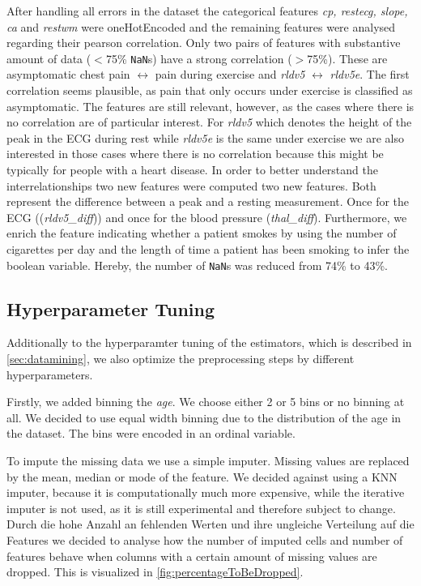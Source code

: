 After handling all errors in the dataset the categorical features \textit{cp, restecg, slope, ca} and \textit{restwm} were oneHotEncoded and the remaining features were analysed regarding their pearson correlation. Only two pairs of features with substantive amount of data ($<$75\% \texttt{NaN}s) have a strong correlation ($>$75\%).  
These are asymptomatic chest pain $\leftrightarrow$ pain during exercise and \textit{rldv5} $\leftrightarrow$ \textit{rldv5e}. The first correlation seems plausible, as pain that only occurs under exercise is classified as asymptomatic. The features are still relevant, however, as the cases where there is no correlation are of particular interest. For \textit{rldv5} which denotes the height of the peak in the ECG during rest while \textit{rldv5e} is the same under exercise we are also interested in those cases where there is no correlation because this might be typically for people with a heart disease. In order to better understand the interrelationships two new features were computed two new features. Both represent the difference between a peak and a resting measurement. Once for the ECG ((\textit{rldv5\_diff})) and once for the blood pressure (\textit{thal\_diff}). 
Furthermore, we enrich the feature indicating whether a patient smokes by using the number of cigarettes per day and the length of time a patient has been smoking to infer the boolean variable. Hereby, the number of \texttt{NaN}s was reduced from 74\% to 43\%. 

\subsection{Hyperparameter Tuning} \label{subsec:hyperparametertuning}
Additionally to the hyperparamter tuning of the estimators, which is described in \cref{sec:datamining}, we also optimize the preprocessing steps by different hyperparameters.

Firstly, we added binning the \textit{age}. We choose either 2 or 5 bins or no binning at all. We decided to use equal width binning due to the distribution of the age in the dataset. The bins were encoded in an ordinal variable. 

To impute the missing data we use a simple imputer. Missing values are replaced by the mean, median or mode of the feature. We decided against using a KNN imputer, because it is computationally much more expensive, while the iterative imputer is not used, as it is still experimental and therefore subject to change. Durch die hohe Anzahl an fehlenden Werten und ihre ungleiche Verteilung auf die Features we decided to analyse how the number of imputed cells and number of features behave when columns with a certain amount of missing values are dropped. This is visualized in \cref{fig:percentageToBeDropped}.


